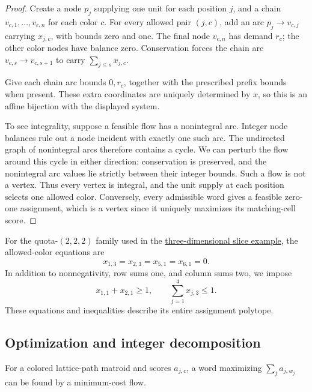 \begin{proof}
Create a node $p_j$ supplying one unit for each position $j$, and a chain
$v_{c,1},\dotsc,v_{c,n}$ for each color $c$. For every allowed pair $(j,c)$,
add an arc $p_j\to v_{c,j}$ carrying $x_{j,c}$, with bounds zero and one.
The final node $v_{c,n}$ has demand $r_c$; the other color nodes have
balance zero. Conservation forces the chain arc $v_{c,s}\to v_{c,s+1}$
to carry $\sum_{j\le s}x_{j,c}$.

Give each chain arc bounds $0,r_c$, together with the prescribed prefix
bounds when present. These extra coordinates are uniquely determined by
$x$, so this is an affine bijection with the displayed system.

To see integrality, suppose a feasible flow has a nonintegral arc.
Integer node balances rule out a node incident with exactly one such arc.
The undirected graph of nonintegral arcs therefore contains a cycle.
We can perturb the flow around this cycle in either direction: conservation
is preserved, and the nonintegral arc values lie strictly between their
integer bounds. Such a flow is not a vertex. Thus every vertex is integral,
and the unit supply at each position selects one allowed color.
Conversely, every admissible word gives a feasible zero-one assignment,
which is a vertex since it uniquely maximizes its matching-cell score.
\end{proof}

\begin{example}
For the quota-$(2,2,2)$ family used in the
\href{lattice-paths.htm#pathRegions}{three-dimensional slice example}, the
allowed-color equations are
\[
 x_{1,3}=x_{2,3}=x_{5,1}=x_{6,1}=0.
\]
In addition to nonnegativity, row sums one, and column sums two, we impose
\[
 x_{1,1}+x_{2,1}\geq1,\qquad
 \sum_{j=1}^4 x_{j,3}\leq1.
\]
These equations and inequalities describe its entire assignment polytope.
\end{example}

\subsection[latticePathFlow]{Optimization and integer decomposition}

\begin{proposition}
For a colored lattice-path matroid and scores $a_{j,c}$, a word maximizing
$\sum_j a_{j,w_j}$ can be found by a minimum-cost flow.
\end{proposition}

